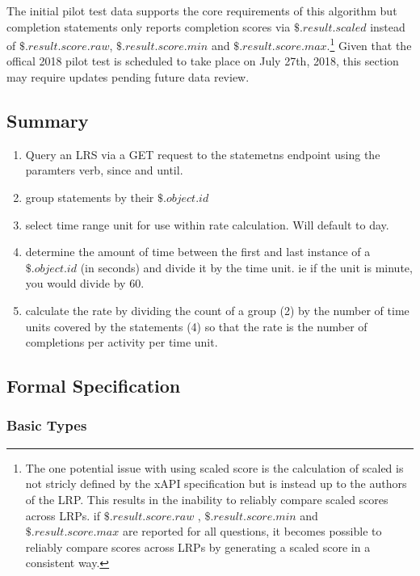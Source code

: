 \documentclass{article}
\begin{document}
The initial pilot test data supports the core requirements of this
algorithm but completion statements only reports completion scores via
$\$.result.scaled$ instead of $\$.result.score.raw$,
$\$.result.score.min$ and
$\$.result.score.max$.\footnote{\label{scaledScores} The one potential
  issue with using scaled score is the
  calculation of scaled is not stricly defined by the xAPI
  specification but is instead up to the authors of the LRP. This
  results in the inability to reliably compare scaled scores across
  LRPs. if $\$.result.score.raw$ , $\$.result.score.min$ and
  $\$.result.score.max$ are reported for all questions, it becomes
  possible to reliably compare scores across LRPs by generating a
  scaled score in a consistent way.} Given that the offical 2018 pilot
test is scheduled to take place on July 27th, 2018, this section may
require updates pending future data review.

\subsection{Summary}

\begin{enumerate}
  \item Query an LRS via a GET request to the statemetns endpoint
    using the paramters verb, since and until.
  \item group statements by their $\$.object.id$
  \item select time range unit for use within rate calculation. Will
    default to day.
  \item determine the amount of time between the first and last instance of a $\$.object.id$ (in seconds) and divide it by the time unit. ie if the unit is minute, you would divide by 60.
  \item calculate the rate by dividing the count of a group (2) by the number of time units covered by the statements (4) so that the rate is the number of completions per activity per time unit.
\end{enumerate}

\subsection{Formal Specification}

\subsubsection{Basic Types}
\end{document}
